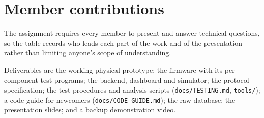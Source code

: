 \section{Member contributions}
\label{sec:o8-10}



The assignment requires every member to present and answer technical questions, so the table records who leads each part of the work and of the presentation rather than limiting anyone's scope of understanding.

Deliverables are the working physical prototype; the firmware with its per-component test programs; the backend, dashboard and simulator; the protocol specification; the test procedures and analysis scripts (\texttt{docs/TESTING.md}, \texttt{tools/}); a code guide for newcomers (\texttt{docs/CODE\_GUIDE.md}); the raw database; the presentation slides; and a backup demonstration video.

